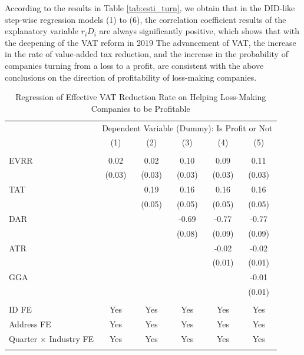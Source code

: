 \documentclass[3p,times]{elsarticle}
\begin{document}
According to the results in Table \ref{tab:esti_turn}, we obtain that in the DID-like step-wise regression models (1) to (6), the correlation coefficient results of the explanatory variable $r_i D_i$ are always significantly positive, which shows that with the deepening of the VAT reform in 2019 The advancement of VAT, the increase in the rate of value-added tax reduction, and the increase in the probability of companies turning from a loss to a profit, are consistent with the above conclusions on the direction of profitability of loss-making companies.
\begin{table}[htp!]
    \centering
    \caption{Regression of Effective VAT Reduction Rate on Helping Loss-Making Companies to be Profitable}
    \begin{threeparttable}
    \begin{tabular}{l|ccccc}%
        \toprule\toprule
        &\multicolumn{5}{c}{Dependent Variable (Dummy): Is Profit or Not }\\
        \cline{2-6}
        & (1) & (2) & (3) & (4) & (5) \\
        \hline
        &  &  &  &  &  \\
        EVRR&0.02&	0.02&	0.10\tnote{***}&	0.09\tnote{***}	&0.11\tnote{***}\\
        &(0.03)&	(0.03)	&(0.03)	&(0.03)&	(0.03)
        \\

        TAT&&0.19\tnote{***}&	0.16\tnote{***}&	0.16\tnote{***}&	0.16\tnote{***}\\&&
        (0.05)&	(0.05)&	(0.05)&	(0.05)\\

        DAR&&&-0.69\tnote{***}&	-0.77\tnote{***}&	-0.77\tnote{***}\\&&&
        (0.08)&	(0.09)	&(0.09)	\\
        ATR&&&&-0.02\tnote{***}&	-0.02\tnote{***}\\
        &&&&(0.01)&	(0.01)\\
        GGA&&&&&-0.01\tnote{*}\\
        &&&&&(0.01)
        \\
        &  &  &  &  &  \\
        ID FE & Yes & Yes& Yes& Yes& Yes  \\
        Address FE & Yes & Yes& Yes& Yes& Yes \\
        Quarter $\times$ Industry FE & Yes & Yes& Yes& Yes& Yes  \\
         &  &  &  &  &  \\
        

\end{tabular}
\end{threeparttable}
\end{table}
\end{document}
